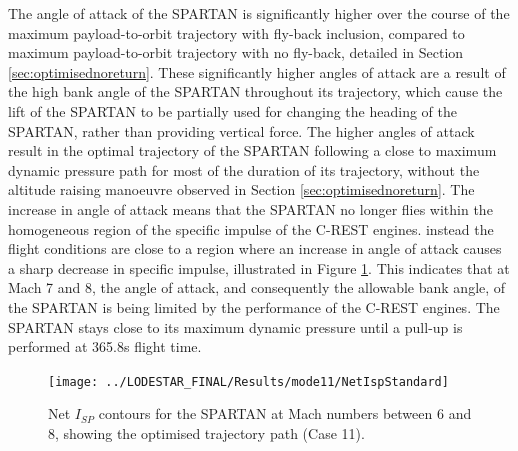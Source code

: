The angle of attack of the SPARTAN is significantly higher over the course of the maximum payload-to-orbit trajectory with fly-back inclusion, compared to maximum payload-to-orbit trajectory with no fly-back, detailed in Section \ref{sec:optimisednoreturn}. These significantly  higher angles of attack are a result of the high bank angle of the SPARTAN throughout its trajectory, which cause the lift of the SPARTAN to be partially used for changing the heading of the SPARTAN, rather than providing vertical force. 
 The higher angles of attack result in the optimal trajectory of the SPARTAN following a close to maximum dynamic pressure path for most of the duration of its trajectory, without the altitude raising manoeuvre observed in Section \ref{sec:optimisednoreturn}.
 The increase in angle of attack means that the SPARTAN no longer flies within the homogeneous region of the specific impulse of the C-REST engines. instead the flight conditions are close to a region where an increase in angle of attack causes a sharp decrease in specific impulse, illustrated in Figure \ref{fig:NetIspStandard}. 
This indicates that at Mach 7 and 8, the angle of attack, and consequently the allowable bank angle, of the SPARTAN is being limited by the performance of the C-REST engines. 
 The SPARTAN stays close to its maximum dynamic pressure until a pull-up is performed at 365.8s flight time. 
 \begin{figure}[!ht]
 	\centering
 	\texttt{[image: ../LODESTAR\_FINAL/Results/mode11/NetIspStandard]}
 	\caption{Net $I_{SP}$ contours for the SPARTAN at Mach numbers between 6 and 8, showing the optimised trajectory path (Case 11). }
 	\label{fig:NetIspStandard}
 \end{figure}

